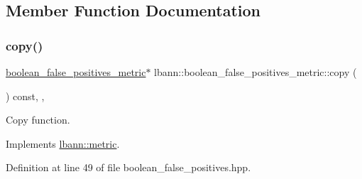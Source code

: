 \subsection{Member Function Documentation}
\mbox{\label{classlbann_1_1boolean__false__positives__metric_a5d9544f3f4dc7e086cf203f5666a7660}} 
\subsubsection{\texorpdfstring{copy()}{copy()}}
{\footnotesize\ttfamily \hyperlink{classlbann_1_1boolean__false__positives__metric}{boolean\+\_\+false\+\_\+positives\+\_\+metric}$\ast$ lbann\+::boolean\+\_\+false\+\_\+positives\+\_\+metric\+::copy (\begin{DoxyParamCaption}{ }\end{DoxyParamCaption}) const\hspace{0.3cm}{\ttfamily [inline]}, {\ttfamily [override]}, {\ttfamily [virtual]}}

Copy function. 

Implements \hyperlink{classlbann_1_1metric_a2a4498d41f77da8585552f485caab167}{lbann\+::metric}.



Definition at line 49 of file boolean\+\_\+false\+\_\+positives.\+hpp.


